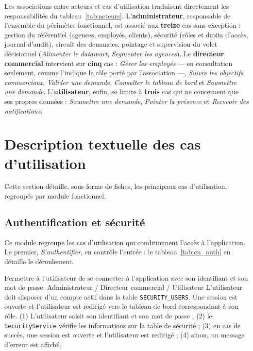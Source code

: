 Les associations entre acteurs et cas d'utilisation traduisent directement les
responsabilités du tableau~\ref{tab:acteurs}. L'\textbf{administrateur},
responsable de l'ensemble du périmètre fonctionnel, est associé aux
\textbf{treize} cas sans exception : gestion du référentiel (agences, employés,
clients), sécurité (rôles et droits d'accès, journal d'audit), circuit des
demandes, pointage et supervision du volet décisionnel (\emph{Alimenter le
datamart}, \emph{Segmenter les agences}). Le \textbf{directeur commercial}
intervient sur \textbf{cinq} cas : \emph{Gérer les employés} --- en consultation
seulement, comme l'indique le rôle porté par l'association ---, \emph{Suivre les
objectifs commerciaux}, \emph{Valider une demande}, \emph{Consulter le tableau de
bord} et \emph{Soumettre une demande}. L'\textbf{utilisateur}, enfin, se limite à
\textbf{trois} cas qui ne concernent que ses propres données : \emph{Soumettre une
demande}, \emph{Pointer la présence} et \emph{Recevoir des notifications}.

\section{Description textuelle des cas d'utilisation}
\label{sec:fiches_cu}
Cette section détaille, sous forme de fiches, les principaux cas d'utilisation,
regroupés par module fonctionnel.

\subsection{Authentification et sécurité}
Ce module regroupe les cas d'utilisation qui conditionnent l'accès à l'application.
Le premier, \emph{S'authentifier}, en contrôle l'entrée : le tableau~\ref{tab:cu_auth}
en détaille le déroulement.

{Permettre à l'utilisateur de se connecter à l'application avec son identifiant et
son mot de passe.}
{Administrateur / Directeur commercial / Utilisateur}
{L'utilisateur doit disposer d'un compte actif dans la table \texttt{SECURITY\_USERS}.}
{Une session est ouverte et l'utilisateur est redirigé vers le tableau de bord
correspondant à son rôle.}
{(1) L'utilisateur saisit son identifiant et son mot de passe ; (2) le
\texttt{SecurityService} vérifie les informations sur la table de sécurité ; (3) en
cas de succès, une session est ouverte et l'utilisateur est redirigé ; (4) sinon,
un message d'erreur est affiché.}

